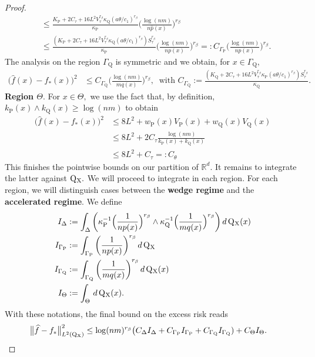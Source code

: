 \documentclass[10pt]{article}
\newcommand{\RR}{\mathbb{R}}
\renewcommand{\P}{\operatorname{P}}
\newcommand{\Q}{\operatorname{Q}}
\renewcommand{\k}{\kappa}
\newcommand{\wh}{\widehat}
\newcommand{\sX}{\mathrm{X}}
\begin{document}
\begin{proof}
\begin{align*}
        &\leq \frac{K_{\P} + 2C_\tau + 16L^2V_\tau^{r_\beta}\k_{\Q}(a\theta/c_1)^{r_\beta}}{\k_{\P}}\bigg(\frac{\log(nm)}{n\wh p(x)}\bigg)^{r_\beta}\\
        &\leq \frac{(K_{\P} + 2C_\tau + 16L^2V_\tau^{r_\beta}\k_{\Q}(a\theta/c_1)^{r_\beta})S_\tau^{r_\beta}}{\k_{\P}}\bigg(\frac{\log(nm)}{n p(x)}\bigg)^{r_\beta}=: C_{\Gamma_{\P}}\bigg(\frac{\log(nm)}{np(x)}\bigg)^{r_\beta}.
    \end{align*}
    The analysis on the region $\Gamma_{\Q}$ is symmetric and we obtain, for $x \in \Gamma_{\Q},$
    \begin{align*}
        \big(\wh f(x) - f_*(x)\big)^2 &\leq C_{\Gamma_{\Q}}\bigg(\frac{\log(nm)}{mq(x)}\bigg)^{r_\beta}, \ \text{ with } C_{\Gamma_{\Q}} := \frac{(K_{\Q} + 2C_\tau + 16L^2V_\tau^{r_\beta}\k_{\P}(a\theta/c_1)^{r_\beta})S_\tau^{r_\beta}}{\k_{\Q}}.
    \end{align*}
    \noindent\textbf{Region $\Theta.$} For $x \in \Theta,$ we use the fact that, by definition, $k_{\P}(x)\wedge k_{\Q}(x) \geq \log(nm)$ to obtain
    \begin{align*}
        \big(\wh f(x) - f_*(x)\big)^2 &\leq 8L^2 + w_{\P}(x) V_{\P}(x) + w_{\Q}(x)V_{\Q}(x)\\
        &\leq 8L^2 + 2C_\tau \frac{\log (nm)}{k_{\P}(x) + k_{\Q}(x)}\\
        &\leq 8L^2 + C_\tau =: C_{\theta}
    \end{align*}
    This finishes the pointwise bounds on our partition of $\RR^d.$ It remains to integrate the latter against $\Q\mathstrut_{\!\sX}.$ We will proceed to integrate in each region. For each region, we will distinguish cases between the \textbf{wedge regime} and the \textbf{accelerated regime}. We define
    \begin{align*}
        I_{\Delta} &:= \int_{\Delta}\bigg(\k_{\P}^{-1}\Big(\frac{1}{np(x)}\Big)^{r_\beta}\wedge\k_{\Q}^{-1}\Big(\frac{1}{mq(x)}\Big)^{r_\beta}\bigg)\, d\Q\mathstrut_{\!\sX}(x)\\
        I_{\Gamma_{\P}} &:= \int_{\Gamma_{\P}}\bigg(\frac{1}{np(x)}\bigg)^{r_\beta}\, d\Q\mathstrut_{\!\sX}\\
        I_{\Gamma_{\Q}} &:= \int_{\Gamma_{\Q}}\bigg(\frac{1}{mq(x)}\bigg)^{r_\beta}\, d\Q\mathstrut_{\!\sX}(x)\\
        I_{\Theta} &:= \int_{\Theta}\, d\Q\mathstrut_{\!\sX}(x).
    \end{align*}
    With these notations, the final bound on the excess risk reads
    \begin{align*}
        \big\|\wh f - f_*\big\|_{L^2(\Q\mathstrut_{\!\sX})}^2 &\leq \log(nm)^{r_\beta}\big(C_{\Delta}I_{\Delta} + C_{\Gamma_{\P}}I_{\Gamma_{\P}} + C_{\Gamma_{\Q}}I_{\Gamma_{\Q}}) + C_{\Theta}I_{\Theta}.
    \end{align*}
    

\end{proof}
\end{document}
